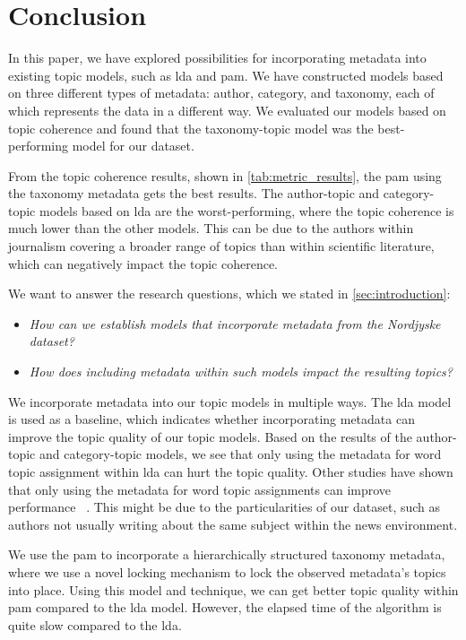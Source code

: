\section{Conclusion}\label{sec:conclusion}
In this paper, we have explored possibilities for incorporating metadata into existing topic models, such as \gls{lda} and \gls{pam}.
We have constructed models based on three different types of metadata: author, category, and taxonomy, each of which represents the data in a different way.
We evaluated our models based on topic coherence and found that the taxonomy-topic model was the best-performing model for our dataset.

From the topic coherence results, shown in \autoref{tab:metric_results}, the \acrfull{pam} using the taxonomy metadata gets the best results.
The author-topic and category-topic models based on \gls{lda} are the worst-performing, where the topic coherence is much lower than the other models. 
This can be due to the authors within journalism covering a broader range of topics than within scientific literature, which can negatively impact the topic coherence.

We want to answer the research questions, which we stated in \autoref{sec:introduction}:

\begin{itemize}	
    \item \textit{How can we establish models that incorporate metadata from the Nordjyske dataset?}	
    \item \textit{How does including metadata within such models impact the resulting topics?}
 \end{itemize}

We incorporate metadata into our topic models in multiple ways.
The \gls{lda} model is used as a baseline, which indicates whether incorporating metadata can improve the topic quality of our topic models.
Based on the results of the author-topic and category-topic models, we see that only using the metadata for word topic assignment within \gls{lda} can hurt the topic quality.
Other studies have shown that only using the metadata for word topic assignments can improve performance~\cite{MetaLDA2017} \cite{author_topic_2012}.
This might be due to the particularities of our dataset, such as authors not usually writing about the same subject within the news environment.  


We use the \gls{pam} to incorporate a hierarchically structured taxonomy metadata, where we use a novel locking mechanism to lock the observed metadata's topics into place.
Using this model and technique, we can get better topic quality within \gls{pam} compared to the \gls{lda} model.
However, the elapsed time of the algorithm is quite slow compared to the \gls{lda}.

